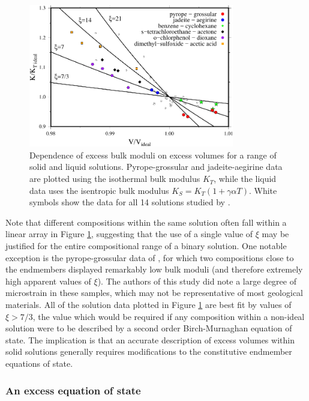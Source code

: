 \begin{figure}[ht!]
  \centering
  \includegraphics[width=0.8\textwidth]{figures/VK_ratio}
  \caption{Dependence of excess bulk moduli on excess volumes for a range of solid and liquid solutions. Pyrope-grossular \citep{DCW2015} and jadeite-aegirine data \citep{NBLBT2006} are plotted using the isothermal bulk modulus $K_T$, while the liquid data \citep{FM1965} uses the isentropic bulk modulus $K_S = K_T \left ( 1+ \gamma \alpha T \right)$. White symbols show the data for all 14 solutions studied by \cite{FM1965}.}
  \label{fig:ksi}
\end{figure}

Note that different compositions within the same solution often fall within a linear array in Figure \ref{fig:ksi}, suggesting that the use of a single value of $\xi$ may be justified for the entire compositional range of a binary solution. One notable exception is the pyrope-grossular data of \cite{DCW2015}, for which two compositions close to the endmembers displayed remarkably low bulk moduli (and therefore extremely high apparent values of $\xi$). The authors of this study did note a large degree of microstrain in these samples, which may not be representative of most geological materials. All of the solution data plotted in Figure \ref{fig:ksi} are best fit by values of $\xi > 7/3$, the value which would be required if any composition within a non-ideal solution were to be described by a second order Birch-Murnaghan equation of state. The implication is that an accurate description of excess volumes within solid solutions generally requires modifications to the constitutive endmember equations of state.


\subsubsection{An excess equation of state}
\label{sec:eos}

